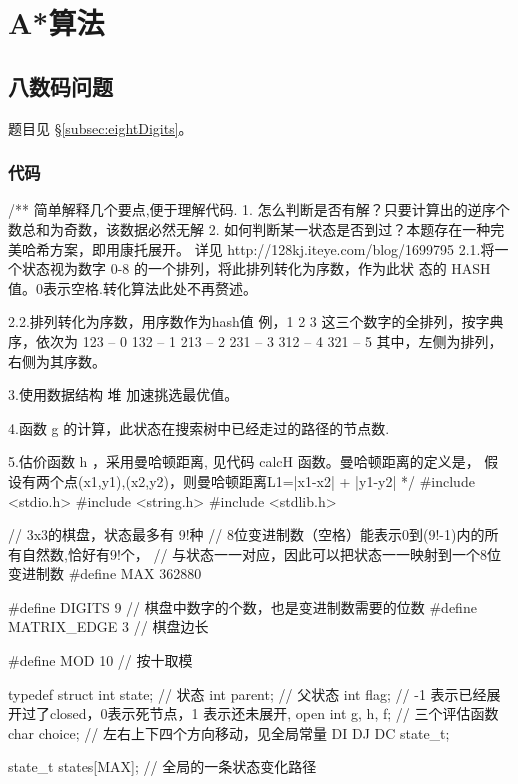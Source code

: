 \section{A*算法} %
\label{sec:astar}

\subsection{八数码问题}
题目见 \S \ref{subsec:eightDigits}。

\subsubsection{代码}
\begin{Codex}[label=eight_digits_astar.c]
/**
 简单解释几个要点,便于理解代码.
 1. 怎么判断是否有解？只要计算出的逆序个数总和为奇数，该数据必然无解
 2. 如何判断某一状态是否到过？本题存在一种完美哈希方案，即用康托展开。
    详见 http://128kj.iteye.com/blog/1699795
    2.1.将一个状态视为数字 0-8 的一个排列，将此排列转化为序数，作为此状
 态的 HASH 值。0表示空格.转化算法此处不再赘述。

    2.2.排列转化为序数，用序数作为hash值
    例，1 2 3 这三个数字的全排列，按字典序，依次为
 123 -- 0
 132 -- 1
 213 -- 2
 231 -- 3
 312 -- 4
 321 -- 5
 其中，左侧为排列，右侧为其序数。
 
 3.使用数据结构 堆 加速挑选最优值。
 
 4.函数 g 的计算，此状态在搜索树中已经走过的路径的节点数.
 
 5.估价函数 h ，采用曼哈顿距离, 见代码 calcH 函数。曼哈顿距离的定义是，
 假设有两个点(x1,y1),(x2,y2)，则曼哈顿距离L1=|x1-x2| + |y1-y2|
 */
#include <stdio.h>
#include <string.h>
#include <stdlib.h>

// 3x3的棋盘，状态最多有 9!种
// 8位变进制数（空格）能表示0到(9!-1)内的所有自然数,恰好有9!个，
// 与状态一一对应，因此可以把状态一一映射到一个8位变进制数
#define     MAX         362880

#define DIGITS 9 // 棋盘中数字的个数，也是变进制数需要的位数
#define     MATRIX_EDGE 3       // 棋盘边长

#define     MOD         10      // 按十取模

typedef struct {
    int state; // 状态
    int parent;     // 父状态
    int flag;   // -1 表示已经展开过了closed，0表示死节点，1 表示还未展开, open
    int g, h, f; // 三个评估函数
    char choice;  // 左右上下四个方向移动，见全局常量 DI DJ DC
} state_t;

state_t states[MAX];  // 全局的一条状态变化路径


\end{Codex}
